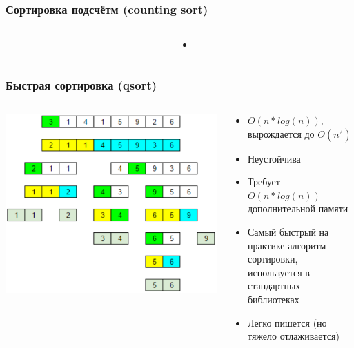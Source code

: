 \documentclass[xetex,mathserif,serif]{beamer}
\begin{document}
	\begin{frame}
		\frametitle{Сортировка подсчётм (counting sort)}
		\begin{columns}
			\begin{column}{0.25\textwidth}
			\end{column}
			\begin{column}{0.75\textwidth}
				\begin{itemize}
					\item
				\end{itemize}
			\end{column}
		\end{columns}
	\end{frame}

	\begin{frame}
		\frametitle{Быстрая сортировка (qsort)}
		\begin{columns}
			\begin{column}{0.5\textwidth}
				\includegraphics[width=\textwidth]{qsort.png}
			\end{column}
			\begin{column}{0.5\textwidth}
				\begin{itemize}
					\item $O(n * log(n))$, вырождается до $O(n^2)$
					\item Неустойчива
					\item Требует $O(n * log(n))$ дополнительной памяти
					\item Самый быстрый на практике алгоритм сортировки, используется в стандартных библиотеках
					\item Легко пишется (но тяжело отлаживается)
				\end{itemize}
			\end{column}
		\end{columns}
	\end{frame}
\end{document}
